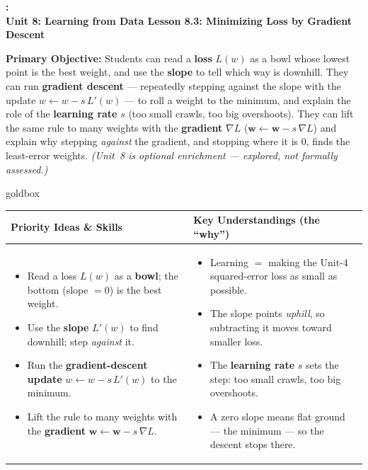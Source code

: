 \documentclass[10pt]{article}
\newcommand{\ww}{\mathbf{w}}
\newcommand{\UnitNumberName}{Unit 8: Learning from Data \quad}
\newcommand{\LessonNumberName}{Lesson 8.3: Minimizing Loss by Gradient Descent}
\begin{document}
\begin{center}
    {\Large\bfseries \CourseName: \SchoolYear \\
    {\small\bfseries \UnitNumberName \LessonNumberName}}
\end{center}

\begin{tcolorbox}[colback=blush, colframe=burgundy, boxrule=0.9pt, arc=2mm,
    left=2mm, right=2mm, top=1.5mm, bottom=1.5mm]
    \textbf{Primary Objective:} Students can read a \textbf{loss} $L(w)$ as a bowl whose lowest point is the
    best weight, and use the \textbf{slope} to tell which way is downhill. They can run \textbf{gradient
    descent} --- repeatedly stepping against the slope with the update $w\leftarrow w-s\,L'(w)$ --- to roll a
    weight to the minimum, and explain the role of the \textbf{learning rate} $s$ (too small crawls, too big
    overshoots). They can lift the same rule to many weights with the \textbf{gradient} $\nabla L$
    ($\ww\leftarrow\ww-s\,\nabla L$) and explain why stepping \emph{against} the gradient, and stopping where it
    is $0$, finds the least-error weights. \emph{(Unit~8 is optional enrichment --- explored, not formally
    assessed.)}
\end{tcolorbox}

\renewcommand{\arraystretch}{1.4}
\begin{skillbox}{goldbox}
\begin{tabularx}{\linewidth}{@{}X|X@{}}
\textbf{Priority Ideas \& Skills} & \textbf{Key Understandings (the ``why'')} \\[2pt]
\hline
\vspace{-6pt}
\begin{itemize}[leftmargin=1.1em, nosep, after=\vspace{2pt}]
  \item Read a loss $L(w)$ as a \textbf{bowl}; the bottom (slope $=0$) is the best weight.
  \item Use the \textbf{slope} $L'(w)$ to find downhill; step \emph{against} it.
  \item Run the \textbf{gradient-descent update} $w\leftarrow w-s\,L'(w)$ to the minimum.
  \item Lift the rule to many weights with the \textbf{gradient} $\ww\leftarrow\ww-s\,\nabla L$.
\end{itemize}
&
\vspace{-6pt}
\begin{itemize}[leftmargin=1.1em, nosep, after=\vspace{2pt}]
  \item Learning $=$ making the Unit-4 squared-error loss as small as possible.
  \item The slope points \emph{uphill}, so subtracting it moves toward smaller loss.
  \item The \textbf{learning rate} $s$ sets the step: too small crawls, too big overshoots.
  \item A zero slope means flat ground --- the minimum --- so the descent stops there.
\end{itemize}
\end{tabularx}
\end{skillbox}
\end{document}

